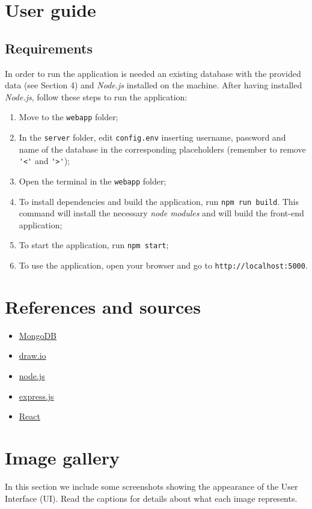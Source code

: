 \documentclass{article}
\begin{document}
\section{User guide}
\subsection{Requirements}
In order to run the application is needed an existing database with the provided data (see Section 4) and \textit{Node.js} installed on the machine.
After having installed \textit{Node.js}, follow these steps to run the application:
\begin{enumerate}
    \item Move to the \verb|webapp| folder;
    \item In the \verb|server| folder, edit \verb|config.env| inserting username, password and name of the database in the corresponding placeholders (remember to remove \verb|'<'| and \verb|'>'|);
    \item Open the terminal in the \verb|webapp| folder;
    \item To install dependencies and build the application, run \verb|npm run build|. This command will install the necessary \textit{node modules} and will build the front-end application;
    \item To start the application, run \verb|npm start|;
    \item To use the application, open your browser and go to \verb|http://localhost:5000|.
\end{enumerate}
\section{References and sources}
\begin{itemize}
    \item \href{https://www.mongodb.com}{MongoDB}
    \item \href{https://app.diagrams.net}{draw.io}
    \item \href{https://nodejs.org}{node.js}
    \item \href{https://expressjs.com}{express.js}
    \item \href{https://reactjs.org/}{React}
\end{itemize}
\section{Image gallery}
In this section we include some screenshots showing the appearance of the User Interface (UI). Read the captions for details about what each image represents.
    
\end{document}
